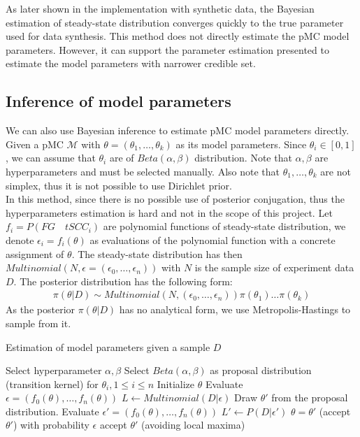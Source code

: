 \documentclass[12pt]{article}
\theoremstyle{definition}
\begin{document}
As later shown in the implementation with synthetic data, the Bayesian
estimation of steady-state distribution converges quickly to the true parameter
used for data synthesis. This method does not directly estimate the pMC
model parameters. However, it can support the parameter estimation presented
\cite{hajnal2019data} to estimate the model parameters with narrower credible
set.

\subsection{Inference of model parameters}
We can also use Bayesian inference to estimate pMC model parameters directly.
Given a pMC $\mathcal{M}$ with $\theta=(\theta_1,\ldots,\theta_k)$ as its model
parameters. Since $\theta_i \in [0,1]$, we can assume that $\theta_i$ are of
$Beta(\alpha, \beta)$ distribution. Note that $\alpha, \beta$ are
hyperparameters and must be selected manually. Also note that
$\theta_1,\ldots,\theta_k$ are not simplex, thus it is not possible to use
Dirichlet prior. \\
In this method, since there is no possible use of posterior conjugation, thus
the hyperparameters estimation is hard and not in the scope of this project. Let
$f_i = P (FG\quad tSCC_i)$ are polynomial functions of steady-state
distribution, we denote $\epsilon_i = f_i(\theta)$ as evaluations of the
polynomial function with a concrete assignment of $\theta$. The steady-state
distribution has then $Multinomial(N, \epsilon = (\epsilon_0,\ldots,\epsilon_n))$ with $N$
is the sample size of experiment data $D$. The posterior distribution has the
following form:
\begin{align*}
  \pi(\theta|D) \sim Multinomial(N, (\epsilon_0,\ldots,\epsilon_n))\pi(\theta_1)\ldots\pi(\theta_k)
\end{align*}
As the posterior $\pi(\theta|D)$ has no analytical form, we use
Metropolis-Hastings to sample from it.
\begin{algorithm}[H]
  \caption{Estimation of model parameters given a sample $D$}\label{exp_b}
  \begin{algorithmic}[1]
    \State Select hyperparameter $\alpha, \beta$
    \State Select $Beta(\alpha, \beta)$ as proposal distribution (transition
    kernel) for $\theta_i, 1\leq i \leq n$
    \State Initialize $\theta$
    \State Evaluate $\epsilon = (f_0(\theta),\ldots,f_n(\theta))$
    \State $L \leftarrow Multinomial(D|\epsilon)$
    \State Draw $\theta'$ from the proposal distribution.
    \State Evaluate $\epsilon' = (f_0(\theta),\ldots,f_n(\theta))$
    \State $L' \leftarrow P(D|\epsilon')$
    \State  $\theta = \theta'$ (accept $\theta'$)
    \Else
    \State with probability $\epsilon$ accept $\theta'$ (avoiding local maxima)
    \EndIf
    \EndWhile
    \EndProcedure
  \end{algorithmic}
\end{algorithm}
\end{document}
